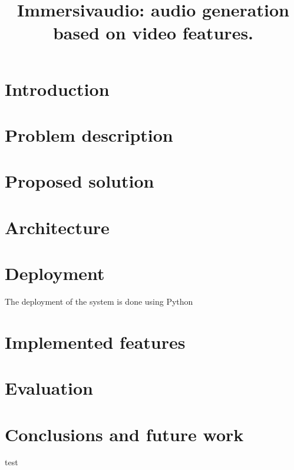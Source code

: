 \documentclass[conference]{IEEEtran}
\begin{document}
\title{Immersivaudio: audio generation based on video features.}

\author{
\and
{}
\and
{}
}

\maketitle

\section{Introduction}

\section{Problem description}

\section{Proposed solution}

\section{Architecture}

\section{Deployment}
The deployment of the system is done using Python 

\section{Implemented features}

\section{Evaluation}

\section{Conclusions and future work}


\begin{thebibliography}{00}
    test
\end{thebibliography}
\end{document}
